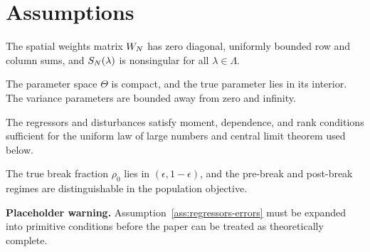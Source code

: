 \section{Assumptions}\label{sec:assumptions}

\begin{assumption}\label{ass:weights}
The spatial weights matrix $W_N$ has zero diagonal, uniformly bounded row and column sums, and $S_N(\lambda)$ is nonsingular for all $\lambda\in\Lambda$.
\end{assumption}

\begin{assumption}\label{ass:parameter-space}
The parameter space $\Theta$ is compact, and the true parameter lies in its interior. The variance parameters are bounded away from zero and infinity.
\end{assumption}

\begin{assumption}\label{ass:regressors-errors}
The regressors and disturbances satisfy moment, dependence, and rank conditions sufficient for the uniform law of large numbers and central limit theorem used below.
\end{assumption}

\begin{assumption}\label{ass:break}
The true break fraction $\rho_0$ lies in $(\epsilon,1-\epsilon)$, and the pre-break and post-break regimes are distinguishable in the population objective.
\end{assumption}

\textbf{Placeholder warning.} Assumption~\ref{ass:regressors-errors} must be expanded into primitive conditions before the paper can be treated as theoretically complete.


